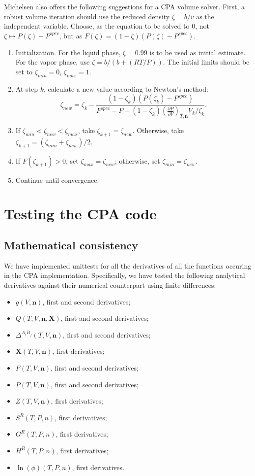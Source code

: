 \documentclass[10pt, a4paper]{article}
\newcommand{\mbf}[0]{\mathbf}
\newcommand*{\pder}[2]{\left(\frac{\partial #1}{\partial #2}\right)}
\newcommand{\z}{\zeta}
\begin{document}
Michelsen also offers the following suggestions for a CPA volume solver. First, a robust volume iteration should use the reduced density $\zeta = b/v$ as the independent variable. Choose, as the equation to be solved to $0$, not $\zeta \mapsto P(\zeta) - P^{spec}$, but as $F(\z) = (1-\z)(P(\zeta) - P^{spec})$. 
\begin{enumerate}
\item Initialization. For the liquid phase, $\zeta = 0.99$ is to be used as initial estimate. For the vapor phase, use $\zeta = b/(b+(RT/P))$. The initial limits should be set to $\z_{min} = 0$, $\z_{max} = 1$.
\item At step $k$, calculate a new value according to Newton's method:
  \begin{equation}
    \z_{new} = \z_k - \frac{(1-\z_k)(P(\z_k) - P^{spec})}{P^{spec} - P + (1-\z_k)\pder{P}{V}_{T,\mbf n}V_k/\zeta_k}.
  \end{equation}
\item If $\z_{min} < \z_{new} < \z_{max}$, take $\z_{k+1} = \z_{new}$. Otherwise, take $\z_{k+1} = (\z_{min} + \z_{new})/2$.
\item If $F(\z_{k+1}) > 0$, set $\z_{max} = \z_{new}$; otherwise, set $\z_{min} = \z_{new}$.
\item Continue until convergence.
\end{enumerate}

\section{Testing the CPA code}
\subsection{Mathematical consistency}
We have implemented unittests for all the derivatives of all the functions occuring in the CPA implementation. Specifically, we have tested the following analytical derivatives against their numerical counterpart using finite differences:
\begin{itemize}
  \item \(g(V,\mbf n)\), first and second derivatives;
  \item \(Q(T,V,\mbf n, \mbf X)\), first and second derivatives;
  \item \(\Delta^{A_i B_j}(T,V,\mbf n)\), first and second derivatives;
  \item \(\mbf X(T,V,\mbf n)\), first derivatives;
  \item \(F(T,V,\mbf n)\), first and second derivatives;
  \item \(P(T,V,\mbf n)\), first and second derivatives;
  \item \(Z(T,V,\mbf n)\), first derivatives;
  \item \(S^R(T,P,n)\), first derivatives;
  \item \(G^R(T,P,n)\), first derivatives;
  \item \(H^R(T,P,n)\), first derivatives;
  \item \(\ln(\phi)(T,P,n)\), first derivatives.
\end{itemize}
\end{document}
